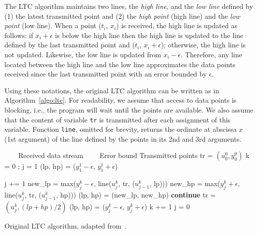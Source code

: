\documentclass[10pt, conference, compsocconf]{IEEEtran}
\newcommand{\Desc}[2]{\State \makebox[2em][l]{#1}#2}
\begin{document}
The LTC algorithm maintains two lines, the \emph{high line}, and the
\emph{low line} defined by (1) the latest transmitted point and (2) the
\emph{high point} (high line) and the \emph{low point} (low line). When
a point ($t_i$, $x_i$) is received, the high line is updated as
follows: if $x_i+\epsilon$ is below the high line then the high line is
updated to the line defined by the last transmitted point and ($t_i$,
$x_i+\epsilon$); otherwise, the high line is not updated. Likewise, the low line
is updated from $x_i-\epsilon$. Therefore, any line located between the
high line and the low line approximates the data points received since
the last transmitted point with an error bounded by $\epsilon$.

Using these notations, the original LTC algorithm can
be written as in Algorithm~\ref{algo:ltc}. For readability, we assume
that access to data points is blocking, i.e., the program will wait
until the points are available. We also assume that the content of
variable \texttt{tr} is transmitted after each assignment of this
variable. Function \texttt{line}, omitted for brevity, returns the
ordinate at abscissa $x$ (1st argument) of the line defined by the points
in its 2nd and 3rd arguments.

\begin{algorithm}
\begin{algorithmic}[1]
\Input
   \Desc{$(u^k_j, y^k_j)$}{$\quad \quad $Received data stream}
   \Desc{$\epsilon$}{$\quad \quad$Error bound}
\EndInput
\Output
   \Desc{tr}{Transmitted points}
\EndOutput
\State tr = $(u^0_0, y^0_0)$ 
\State k = 0 ; j = 1
\State (lp, hp) = ($y^1_1 - \epsilon$, $y^1_1 + \epsilon$) 

 
    \State j += 1
    \State new\_lp = max($y^k_j-\epsilon$, line($u^k_j$, tr, ($u^k_{j-1}$, lp)))
    \State new\_hp = max($y^k_j+\epsilon$, line($u^k_j$, tr, ($u^k_{j-1}$, hp)))
     
        \State (lp, hp) = (new\_lp, new\_hp)
        \State \textbf{continue}
    \EndIf
    \State tr = $(u^k_j, (lp+hp)/2)$
    \State (lp, hp) = ($y^k_j-\epsilon$, $y^k_j+\epsilon$)
    \State k += 1
    \State j = 0
\EndWhile
\end{algorithmic}
\caption{Original LTC algorithm, adapted from~\cite{schoellhammer2004lightweight}.}
\label{algo:ltc}
\end{algorithm}
\end{document}
